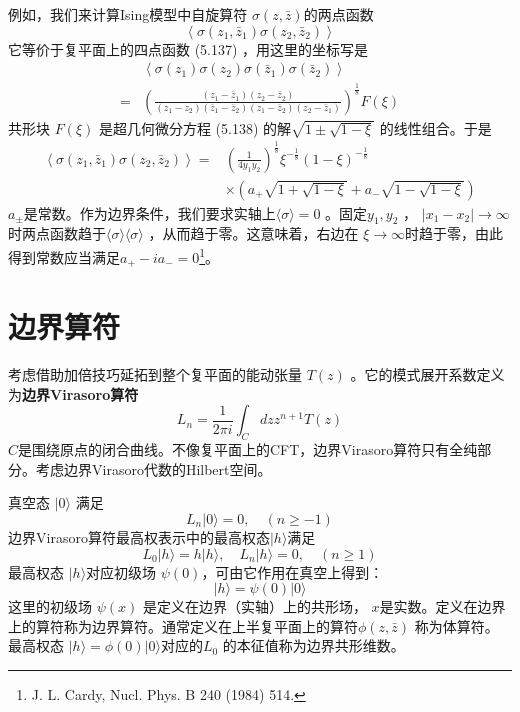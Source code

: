 例如，我们来计算Ising模型中自旋算符 $\sigma(z, \bar{z}) $的两点函数
$$
\left\langle\sigma\left(z_{1}, \bar{z}_{1}\right) \sigma\left(z_{2}, \bar{z}_{2}\right)\right\rangle
$$
它等价于复平面上的四点函数 (5.137) ，用这里的坐标写是
\begin{equation}
	\begin{aligned} &\left\langle\sigma\left(z_{1}\right) \sigma\left(z_{2}\right) \sigma\left(\bar{z}_{1}\right) \sigma\left(\bar{z}_{2}\right)\right\rangle \\ =&\left(\frac{\left(z_{1}-\bar{z}_{1}\right)\left(z_{2}-\bar{z}_{2}\right)}{\left(z_{1}-z_{2}\right)\left(\bar{z}_{1}-\bar{z}_{2}\right)\left(z_{1}-\bar{z}_{2}\right)\left(z_{2}-\bar{z}_{1}\right)}\right)^{\frac{1}{8}} F(\xi) \end{aligned} 
\end{equation}
共形块 $F(\xi)$ 是超几何微分方程 (5.138) 的解$ \sqrt{1 \pm \sqrt{1-\xi}}$ 的线性组合。于是
\begin{equation}
	\begin{aligned} \left\langle\sigma\left(z_{1}, \bar{z}_{1}\right) \sigma\left(z_{2}, \bar{z}_{2}\right)\right\rangle=&\left(\frac{1}{4 y_{1} y_{2}}\right)^{\frac{1}{8}} \xi^{-\frac{1}{8}}(1-\xi)^{-\frac{1}{8}} \\ & \times\left(a_{+} \sqrt{1+\sqrt{1-\xi}}+a_{-} \sqrt{1-\sqrt{1-\xi}}\right) \end{aligned}
\end{equation} 
$a_\pm $是常数。作为边界条件，我们要求实轴上$ \langle\sigma\rangle=0$ 。固定$ y_1,y_2$ ， $\left|x_{1}-x_{2}\right| \rightarrow \infty $时两点函数趋于$ \langle\sigma\rangle\langle\sigma\rangle$ ，从而趋于零。这意味着，右边在 $\xi \rightarrow \infty $时趋于零，由此得到常数应当满足$ a_{+}-ia_{-} =0 $\footnote{J. L. Cardy, Nucl. Phys. B 240 (1984) 514.}。

\section{边界算符}
考虑借助加倍技巧延拓到整个复平面的能动张量 $T(z)$ 。它的模式展开系数定义为\textbf{边界Virasoro算符}
\begin{equation}
	L_{n}=\frac{1}{2 \pi i} \int_{C} d z z^{n+1} T(z) 
\end{equation}
$C $是围绕原点的闭合曲线。不像复平面上的CFT，边界Virasoro算符只有全纯部分。考虑边界Virasoro代数的Hilbert空间。

真空态 $|0\rangle$ 满足
\begin{equation}
	L_{n}|0\rangle=0, \quad(n \geq-1)
\end{equation} 
边界Virasoro算符最高权表示中的最高权态$ |h\rangle $满足
\begin{equation}
	L_{0}|h\rangle=h|h\rangle, \quad L_{n}|h\rangle=0, \quad(n \geq 1)
\end{equation} 
最高权态 $|h\rangle $对应初级场 $\psi(0) $，可由它作用在真空上得到：
\begin{equation}
	|h\rangle=\psi(0)|0\rangle 
\end{equation}
这里的初级场 $\psi(x)$ 是定义在边界（实轴）上的共形场， $x $是实数。定义在边界上的算符称为边界算符。通常定义在上半复平面上的算符$ \phi(z, \bar{z})$ 称为体算符。最高权态 $|h\rangle=\phi(0)|0\rangle $对应的$ L_0$ 的本征值称为边界共形维数。

